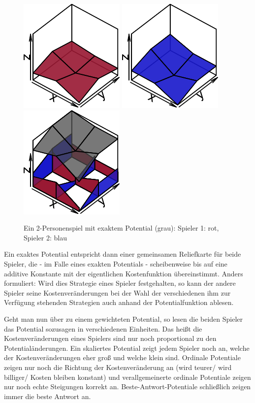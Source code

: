 \begin{figure}[h]\centering
	\includegraphics[width=.3\textwidth]{../Bilder/exaktesPotentialSp1.pdf}
	\includegraphics[width=.3\textwidth]{../Bilder/exaktesPotentialSp2.pdf}
	\includegraphics[width=.3\textwidth]{../Bilder/exaktesPotential.pdf}
	\caption{Ein 2-Personenspiel mit exaktem Potential (grau): Spieler 1: rot, Spieler 2: blau}
\end{figure}

Ein exaktes Potential entspricht dann einer gemeinsamen Reliefkarte für beide Spieler, die - im Falle eines exakten Potentials - \glqq scheibenweise\grqq{} bis auf eine additive Konstante mit der eigentlichen Kostenfunktion übereinstimmt. Anders formuliert: Wird dies Strategie eines Spieler festgehalten, so kann der andere Spieler seine Kostenveränderungen bei der Wahl der verschiedenen ihm zur Verfügung stehenden Strategien auch anhand der Potentialfunktion ablesen. 

Geht man nun über zu einem gewichteten Potential, so lesen die beiden Spieler das Potential sozusagen in verschiedenen Einheiten. Das heißt die Kostenveränderungen eines Spielers sind nur noch proportional zu den Potentialänderungen. Ein skaliertes Potential zeigt jedem Spieler noch an, welche der Kostenveränderungen eher groß und welche klein sind. Ordinale Potentiale zeigen nur noch die Richtung der Kostenveränderung an (\glqq wird teurer\grqq / \glqq wird billiger\grqq / \glqq Kosten bleiben konstant\grqq) und verallgemeinerte ordinale Potentiale zeigen nur noch echte Steigungen korrekt an. Beste-Antwort-Potentiale schließlich zeigen immer die beste Antwort an.


